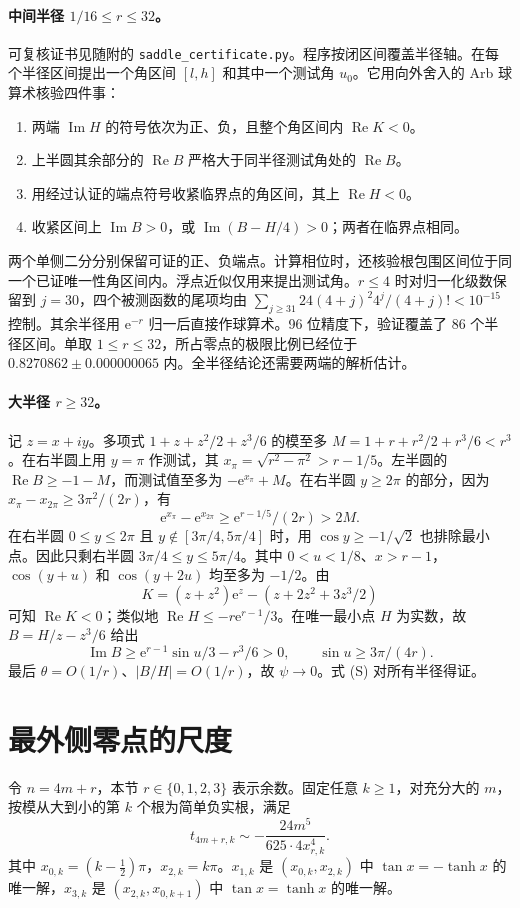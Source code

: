 \documentclass[UTF8,fontset=fandol,11pt,a4paper]{ctexart}
\newcommand{\Rea}{\operatorname{Re}}
\newcommand{\Ima}{\operatorname{Im}}
\newcommand{\expo}{\mathrm e}
\begin{document}
\paragraph{中间半径 $1/16\le r\le32$。}
可复核证书见随附的 \texttt{saddle\_certificate.py}。程序按闭区间覆盖半径轴。在每个半径区间提出一个角区间 $[l,h]$ 和其中一个测试角 $u_0$。它用向外舍入的 Arb 球算术核验四件事：
\begin{enumerate}
\item 两端 $\Ima H$ 的符号依次为正、负，且整个角区间内 $\Rea K<0$。
\item 上半圆其余部分的 $\Rea B$ 严格大于同半径测试角处的 $\Rea B$。
\item 用经过认证的端点符号收紧临界点的角区间，其上 $\Rea H<0$。
\item 收紧区间上 $\Ima B>0$，或 $\Ima(B-H/4)>0$；两者在临界点相同。
\end{enumerate}
两个单侧二分分别保留可证的正、负端点。计算相位时，还核验根包围区间位于同一个已证唯一性角区间内。浮点近似仅用来提出测试角。$r\le4$ 时对归一化级数保留到 $j=30$，四个被测函数的尾项均由 $\sum_{j\ge31}24(4+j)^2 4^j/(4+j)!<10^{-15}$ 控制。其余半径用 $\expo^{-r}$ 归一后直接作球算术。96 位精度下，验证覆盖了 86 个半径区间。单取 $1\le r\le32$，所占零点的极限比例已经位于 $0.8270862\pm0.000000065$ 内。全半径结论还需要两端的解析估计。

\paragraph{大半径 $r\ge32$。}
记 $z=x+iy$。多项式 $1+z+z^2/2+z^3/6$ 的模至多 $M=1+r+r^2/2+r^3/6<r^3$。在右半圆上用 $y=\pi$ 作测试，其 $x_\pi=\sqrt{r^2-\pi^2}>r-1/5$。左半圆的 $\Rea B\ge-1-M$，而测试值至多为 $-\expo^{x_\pi}+M$。在右半圆 $y\ge2\pi$ 的部分，因为 $x_\pi-x_{2\pi}\ge3\pi^2/(2r)$，有
\[
 \expo^{x_\pi}-\expo^{x_{2\pi}}\ge\expo^{r-1/5}/(2r)>2M .
\]
在右半圆 $0\le y\le2\pi$ 且 $y\notin[3\pi/4,5\pi/4]$ 时，用 $\cos y\ge-1/\sqrt2$ 也排除最小点。因此只剩右半圆 $3\pi/4\le y\le5\pi/4$。其中 $0<u<1/8$、$x>r-1$，$\cos(y+u)$ 和 $\cos(y+2u)$ 均至多为 $-1/2$。由
\[
 K=(z+z^2)\expo^z-(z+2z^2+3z^3/2)
\]
可知 $\Rea K<0$；类似地 $\Rea H\le-r\expo^{r-1}/3$。在唯一最小点 $H$ 为实数，故 $B=H/z-z^3/6$ 给出
\[
 \Ima B\ge \expo^{r-1}\sin u/3-r^3/6>0,\qquad
 \sin u\ge3\pi/(4r).
\]
最后 $\theta=O(1/r)$、$|B/H|=O(1/r)$，故 $\psi\to0$。式 (S) 对所有半径得证。

\section{最外侧零点的尺度}
令 $n=4m+r$，本节 $r\in\{0,1,2,3\}$ 表示余数。固定任意 $k\ge1$，对充分大的 $m$，按模从大到小的第 $k$ 个根为简单负实根，满足
\[
 t_{4m+r,k}\sim-\frac{24m^5}{625\cdot4x_{r,k}^4}.
\]
其中 $x_{0,k}=(k-\tfrac12)\pi$，$x_{2,k}=k\pi$。$x_{1,k}$ 是 $(x_{0,k},x_{2,k})$ 中 $\tan x=-\tanh x$ 的唯一解，$x_{3,k}$ 是 $(x_{2,k},x_{0,k+1})$ 中 $\tan x=\tanh x$ 的唯一解。
\end{document}
